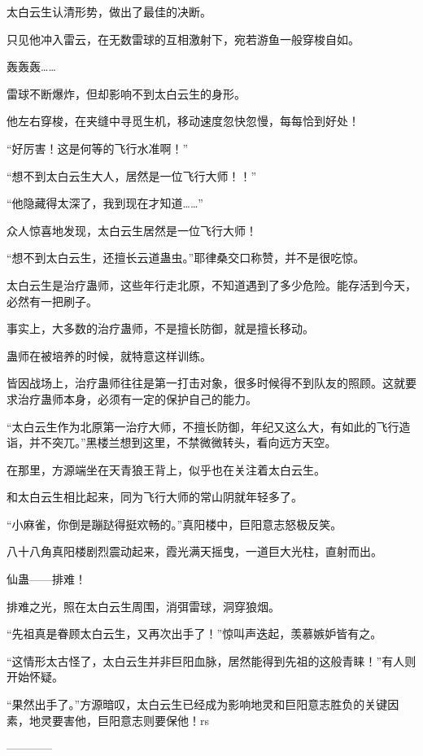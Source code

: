 \begin{this_body}
太白云生认清形势，做出了最佳的决断。

只见他冲入雷云，在无数雷球的互相激射下，宛若游鱼一般穿梭自如。

轰轰轰……

雷球不断爆炸，但却影响不到太白云生的身形。

他左右穿梭，在夹缝中寻觅生机，移动速度忽快忽慢，每每恰到好处！

“好厉害！这是何等的飞行水准啊！”

“想不到太白云生大人，居然是一位飞行大师！！”

“他隐藏得太深了，我到现在才知道……”

众人惊喜地发现，太白云生居然是一位飞行大师！

“想不到太白云生，还擅长云道蛊虫。”耶律桑交口称赞，并不是很吃惊。

太白云生是治疗蛊师，这些年行走北原，不知道遇到了多少危险。能存活到今天，必然有一把刷子。

事实上，大多数的治疗蛊师，不是擅长防御，就是擅长移动。

蛊师在被培养的时候，就特意这样训练。

皆因战场上，治疗蛊师往往是第一打击对象，很多时候得不到队友的照顾。这就要求治疗蛊师本身，必须有一定的保护自己的能力。

“太白云生作为北原第一治疗大师，不擅长防御，年纪又这么大，有如此的飞行造诣，并不突兀。”黑楼兰想到这里，不禁微微转头，看向远方天空。

在那里，方源端坐在天青狼王背上，似乎也在关注着太白云生。

和太白云生相比起来，同为飞行大师的常山阴就年轻多了。

“小麻雀，你倒是蹦跶得挺欢畅的。”真阳楼中，巨阳意志怒极反笑。

八十八角真阳楼剧烈震动起来，霞光满天摇曳，一道巨大光柱，直射而出。

仙蛊——排难！

排难之光，照在太白云生周围，消弭雷球，洞穿狼烟。

“先祖真是眷顾太白云生，又再次出手了！”惊叫声迭起，羡慕嫉妒皆有之。

“这情形太古怪了，太白云生并非巨阳血脉，居然能得到先祖的这般青睐！”有人则开始怀疑。

“果然出手了。”方源暗叹，太白云生已经成为影响地灵和巨阳意志胜负的关键因素，地灵要害他，巨阳意志则要保他！rs

------------

\end{this_body}

